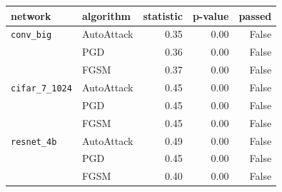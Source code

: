 \begin{tabular}{llrrr}
\toprule
network & algorithm & statistic & p-value & passed \\
\midrule
\texttt{conv\_big} & AutoAttack & 0.35 & 0.00 & False \\
 & PGD & 0.36 & 0.00 & False \\
 & FGSM & 0.37 & 0.00 & False \\
\texttt{cifar\_7\_1024} & AutoAttack & 0.45 & 0.00 & False \\
 & PGD & 0.45 & 0.00 & False \\
 & FGSM & 0.45 & 0.00 & False \\
\texttt{resnet\_4b} & AutoAttack & 0.49 & 0.00 & False \\
 & PGD & 0.45 & 0.00 & False \\
 & FGSM & 0.40 & 0.00 & False \\
\bottomrule
\end{tabular}
